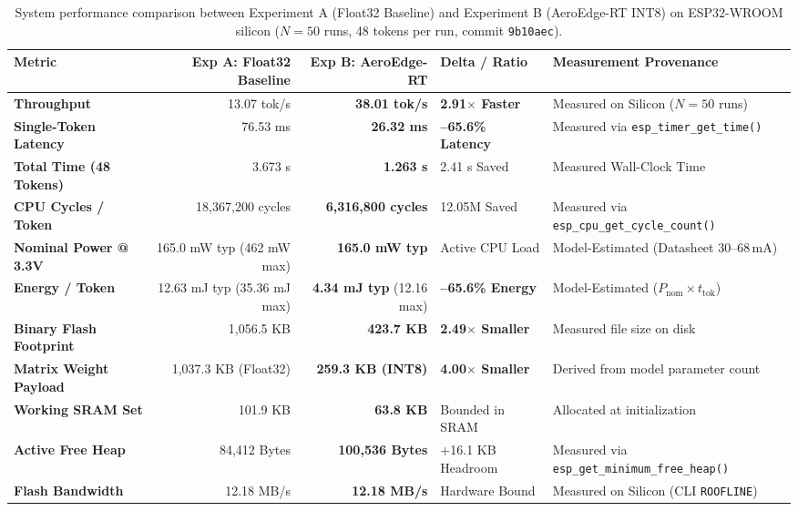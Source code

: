 \documentclass[10pt,a4paper]{article}
\begin{document}
\begin{table}[t]
\centering
\small
\caption{System performance comparison between Experiment A (Float32 Baseline) and Experiment B (AeroEdge-RT INT8) on ESP32-WROOM silicon ($N=50$ runs, 48 tokens per run, commit \texttt{9b10aec}).}
\label{tab:summary_findings}
\begin{tabularx}{\textwidth}{l r r l X}
\toprule
\textbf{Metric} & \textbf{Exp A: Float32 Baseline} & \textbf{Exp B: AeroEdge-RT} & \textbf{Delta / Ratio} & \textbf{Measurement Provenance} \\
\midrule
\textbf{Throughput} & 13.07 tok/s & \textbf{38.01 tok/s} & \textbf{2.91$\times$ Faster} & Measured on Silicon ($N=50$ runs) \\
\textbf{Single-Token Latency} & 76.53 ms & \textbf{26.32 ms} & \textbf{--65.6\% Latency} & Measured via \texttt{esp\_timer\_get\_time()} \\
\textbf{Total Time (48 Tokens)}& 3.673 s & \textbf{1.263 s} & 2.41 s Saved & Measured Wall-Clock Time \\
\textbf{CPU Cycles / Token} & 18,367,200 cycles & \textbf{6,316,800 cycles} & 12.05M Saved & Measured via \texttt{esp\_cpu\_get\_cycle\_count()} \\
\textbf{Nominal Power @ 3.3V} & 165.0 mW typ (462 mW max) & \textbf{165.0 mW typ} & Active CPU Load & Model-Estimated (Datasheet 30--68\,mA) \\
\textbf{Energy / Token} & 12.63 mJ typ (35.36 mJ max) & \textbf{4.34 mJ typ} (12.16 max) & \textbf{--65.6\% Energy} & Model-Estimated ($P_{\text{nom}} \times t_{\text{tok}}$) \\
\textbf{Binary Flash Footprint}& 1,056.5 KB & \textbf{423.7 KB} & \textbf{2.49$\times$ Smaller} & Measured file size on disk \\
\textbf{Matrix Weight Payload} & 1,037.3 KB (Float32) & \textbf{259.3 KB (INT8)} & \textbf{4.00$\times$ Smaller} & Derived from model parameter count \\
\textbf{Working SRAM Set} & 101.9 KB & \textbf{63.8 KB} & Bounded in SRAM & Allocated at initialization \\
\textbf{Active Free Heap} & 84,412 Bytes & \textbf{100,536 Bytes} & +16.1 KB Headroom & Measured via \texttt{esp\_get\_minimum\_free\_heap()} \\
\textbf{Flash Bandwidth} & 12.18 MB/s & \textbf{12.18 MB/s} & Hardware Bound & Measured on Silicon (CLI \texttt{ROOFLINE}) \\
\bottomrule
\end{tabularx}
\end{table}
\end{document}
